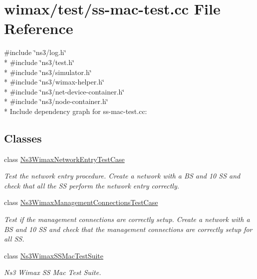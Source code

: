 \hypertarget{ss-mac-test_8cc}{}\section{wimax/test/ss-\/mac-\/test.cc File Reference}
\label{ss-mac-test_8cc}
{\ttfamily \#include \char`\"{}ns3/log.\+h\char`\"{}}\\*
{\ttfamily \#include \char`\"{}ns3/test.\+h\char`\"{}}\\*
{\ttfamily \#include \char`\"{}ns3/simulator.\+h\char`\"{}}\\*
{\ttfamily \#include \char`\"{}ns3/wimax-\/helper.\+h\char`\"{}}\\*
{\ttfamily \#include \char`\"{}ns3/net-\/device-\/container.\+h\char`\"{}}\\*
{\ttfamily \#include \char`\"{}ns3/node-\/container.\+h\char`\"{}}\\*
Include dependency graph for ss-\/mac-\/test.cc\+:
\subsection*{Classes}
\begin{DoxyCompactItemize}
\item 
class \hyperlink{classNs3WimaxNetworkEntryTestCase}{Ns3\+Wimax\+Network\+Entry\+Test\+Case}
\begin{DoxyCompactList}\small\item\em Test the network entry procedure. Create a network with a BS and 10 SS and check that all the SS perform the network entry correctly. \end{DoxyCompactList}\item 
class \hyperlink{classNs3WimaxManagementConnectionsTestCase}{Ns3\+Wimax\+Management\+Connections\+Test\+Case}
\begin{DoxyCompactList}\small\item\em Test if the management connections are correctly setup. Create a network with a BS and 10 SS and check that the management connections are correctly setup for all SS. \end{DoxyCompactList}\item 
class \hyperlink{classNs3WimaxSSMacTestSuite}{Ns3\+Wimax\+S\+S\+Mac\+Test\+Suite}
\begin{DoxyCompactList}\small\item\em Ns3 Wimax SS Mac Test Suite. \end{DoxyCompactList}\end{DoxyCompactItemize}
